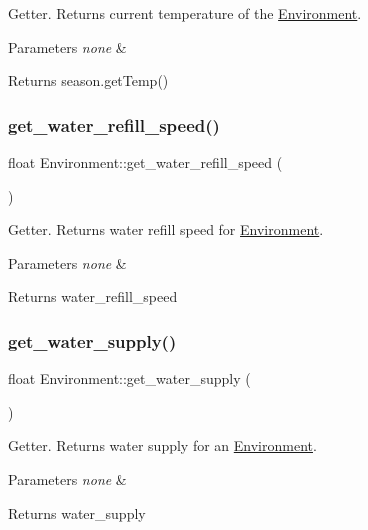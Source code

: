 Getter. Returns current temperature of the \hyperlink{class_environment}{Environment}. 
\begin{DoxyParams}{Parameters}
{\em none} & \\
\hline
\end{DoxyParams}
\begin{DoxyReturn}{Returns}
season.\+get\+Temp() 
\end{DoxyReturn}
\mbox{\label{class_environment_a22323f11696c983cfb936fbc55442a5d}} 
\subsubsection{\texorpdfstring{get\+\_\+water\+\_\+refill\+\_\+speed()}{get\_water\_refill\_speed()}}
{\footnotesize\ttfamily float Environment\+::get\+\_\+water\+\_\+refill\+\_\+speed (\begin{DoxyParamCaption}{ }\end{DoxyParamCaption})}

Getter. Returns water refill speed for \hyperlink{class_environment}{Environment}. 
\begin{DoxyParams}{Parameters}
{\em none} & \\
\hline
\end{DoxyParams}
\begin{DoxyReturn}{Returns}
water\+\_\+refill\+\_\+speed 
\end{DoxyReturn}
\mbox{\label{class_environment_a34f8cb7070c04c78bff5a4e32e1c4529}} 
\subsubsection{\texorpdfstring{get\+\_\+water\+\_\+supply()}{get\_water\_supply()}}
{\footnotesize\ttfamily float Environment\+::get\+\_\+water\+\_\+supply (\begin{DoxyParamCaption}{ }\end{DoxyParamCaption})}

Getter. Returns water supply for an \hyperlink{class_environment}{Environment}. 
\begin{DoxyParams}{Parameters}
{\em none} & \\
\hline
\end{DoxyParams}
\begin{DoxyReturn}{Returns}
water\+\_\+supply 
\end{DoxyReturn}
\mbox{\label{class_environment_a2d4d7e655a5d1fad7e6a74bc9e52d028}} 
